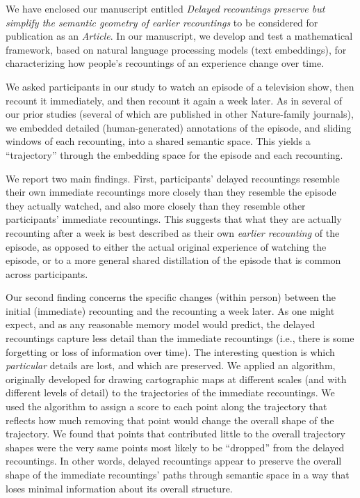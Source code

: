 \documentclass[11pt,stdletter,orderfromtodate,sigleft]{newlfm}
\newcommand{\articletype}{Article}
\newcommand{\myTitle}{Delayed recountings preserve but simplify the semantic geometry of earlier recountings}
\begin{document}
\begin{newlfm}

  We have enclosed our manuscript entitled \textit{\myTitle} to be considered
  for publication as an \textit{\articletype}. In our manuscript, we develop and test a mathematical framework,
  based on natural language processing models (text embeddings), for characterizing how
  people's recountings of an experience change over time.

  We asked participants in our study to watch an episode of a television show,
  then recount it immediately, and then recount it again a week later. As in
  several of our prior studies (several of which are published in other Nature-family journals), we embedded detailed
  (human-generated) annotations of the episode, and sliding windows of each recounting, into 
  a shared semantic space. This yields a ``trajectory'' through the embedding space
  for the episode and each recounting.

  We report two main findings. First, participants' delayed recountings resemble their own
  immediate recountings more closely than they resemble the episode they actually watched,
  and also more closely than they resemble other participants' immediate recountings. This
  suggests that what they are actually recounting after a week is best described as
  their own \textit{earlier recounting} of the episode, as opposed to either the
  actual original experience of watching the episode, or to a more general shared distillation
  of the episode that is common across participants.

  Our second finding concerns the specific changes (within person)
  between the initial (immediate) recounting and the recounting a week later. As one might expect,
  and as any reasonable memory model would predict,
  the delayed recountings capture less detail than the immediate recountings (i.e., there is some forgetting or loss of information over time).
  The interesting question is which \textit{particular} details are lost, and which are preserved.
  We applied an algorithm, originally developed for drawing cartographic maps at different scales (and with different levels of detail)
  to the trajectories of the immediate recountings. We used the algorithm to assign a score to each
  point along the trajectory that reflects how much removing that point would change the overall shape
  of the trajectory. We found that points that contributed little to the overall trajectory shapes
  were the very same points most likely to be ``dropped'' from the delayed recountings.
  In other words, delayed recountings appear to preserve the overall shape of the immediate recountings'
  paths through semantic space in a way that loses minimal information about its overall structure.


\end{newlfm}
\end{document}
